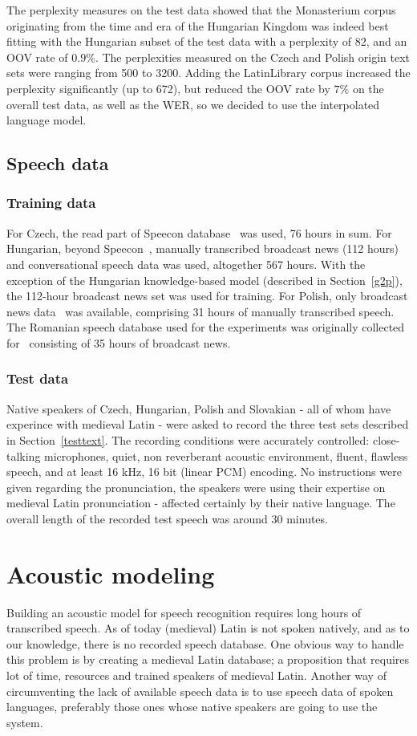 \documentclass[runningheads,a4paper]{llncs}
\begin{document}
The perplexity measures on the test data showed that the Monasterium corpus originating from the time and era of the Hungarian Kingdom was indeed best fitting with the Hungarian subset of the test data with a perplexity of 82, and an OOV rate of $0.9\%$.
The perplexities measured on the Czech and Polish origin text sets were ranging from 500 to 3200.
Adding the LatinLibrary corpus increased the perplexity significantly (up to 672), but reduced the OOV rate by $7\%$ on the overall test data, as well as the WER, so we decided to use the interpolated language model.

\subsection{Speech data}
\subsubsection{Training data}\label{speechtraining}
For Czech, the read part of Speecon database~\cite{czech} was used, 76 hours in sum.
For Hungarian, beyond Speecon~\cite{hungarian}, manually transcribed broadcast news (112 hours) and conversational speech data was used, altogether 567 hours.
With the exception of the Hungarian knowledge-based model (described in Section~\ref{g2p}), the 112-hour broadcast news set was used for training.
For Polish, only broadcast news data~\cite{romanian} was available, comprising 31 hours of manually transcribed speech.
The Romanian speech database used for the experiments was originally collected for~\cite{romanian} consisting of 35 hours of broadcast news.
\subsubsection{Test data}
Native speakers of Czech, Hungarian, Polish and Slovakian - all of whom have experince with medieval Latin - were asked to record the three test sets described in Section~\ref{testtext}.
The recording conditions were accurately controlled: close-talking microphones, quiet, non reverberant acoustic environment, fluent, flawless speech, and at least 16 kHz, 16 bit (linear PCM) encoding.
No instructions were given regarding the pronunciation, the speakers were using their expertise on medieval Latin pronunciation - affected certainly by their native language.
The overall length of the recorded test speech was around 30 minutes.

\section{Acoustic modeling}\label{AM}
Building an acoustic model for speech recognition requires long hours of transcribed speech.
As of today (medieval) Latin is not spoken natively, and as to our knowledge, there is no recorded speech database.
One obvious way to handle this problem is by creating a medieval Latin database; a proposition that requires lot of time, resources and trained speakers of medieval Latin. 
Another way of circumventing the lack of available speech data is to use speech data of spoken languages, preferably those ones whose native speakers are going to use the system. 
\end{document}
